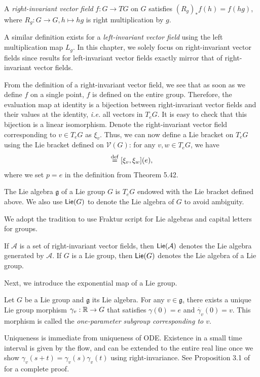 \documentclass[12pt,class=article,crop=false]{standalone}
\begin{document}
\begin{defn}
	A \emph{right-invariant vector field} $ f: G \to TG$ on $ G$ satisfies $ (R_g)_* f (h) = f(hg)$, where $ R_g: G \to G, h \mapsto hg$ is right multiplication by $ g$.
\end{defn}
\begin{remark}
A similar definition exists for a \emph{left-invariant vector field} using the left multiplication map $ L_g$. In this chapter, we solely focus on right-invariant vector fields since results for left-invariant vector fields exactly mirror that of right-invariant vector fields.
\end{remark}
From the definition of a right-invariant vector field, we see that as soon as we define $ f$ on a single point,  $ f$ is defined on the entire group. Therefore, the evaluation map at identity is a bijection between right-invariant vector fields and their values at the identity, \emph{i.e.} all vectors in  $T_eG $. It is easy to check that this bijection is a linear isomorphism. Denote the right-invariant vector field corresponding to $ v \in T_eG$ as $ \xi_v$. Thus, we can now define a Lie bracket on $ T_eG$ using the Lie bracket defined on  $ \mathcal{ V}(G)$: for any $ v,w \in T_eG$, we have 
\begin{align*}
	[v,w] \defeq [\xi_v, \xi_w](e),
\end{align*}
where we set $ p = e $ in the definition from Theorem 5.42.
\begin{defn}
The Lie algebra $ \mathfrak{g} $ of a Lie group $ G$ is  $ T_eG$ endowed with the Lie bracket defined above. We also use  $\mathsf{Lie}( G)$ to denote the Lie algebra of $ G$ to avoid ambiguity.
\end{defn}
We adopt the tradition to use Fraktur script for Lie algebras and capital letters for groups.
\begin{remark}
If $ \mathcal{ A}$ is a set of right-invariant vector fields, then $ \mathsf{Lie}( \mathcal{ A} )$ denotes the Lie algebra generated by $ \mathcal{ A}$. If $ G$ is a Lie group, then  $ \mathsf{Lie}( G)$ denotes the Lie algebra of a Lie group. 
\end{remark}
Next, we introduce the exponential map of a Lie group.
\begin{fact}
Let $ G$ be a Lie group and  $ \mathfrak{g} $ its Lie algebra. For any $ v \in \mathfrak{g} $, there exists a unique Lie group morphism $ \gamma_v: \mathbb{R} \to G $ that satisfies $\gamma(0) = e$ and  $\dot{ \gamma_v}(0) = v$. This morphism is called the \emph{one-parameter subgroup corresponding to $ v$}. 
\end{fact}
Uniqueness is immediate from uniqueness of ODE. Existence in a small time interval is given by the flow, and can be extended to the entire real line once we show $ \gamma_v(s+t) = \gamma_v(s) \gamma_v(t)$ using right-invariance. See Proposition 3.1 of \cite{TODO} for a complete proof.
\end{document}
